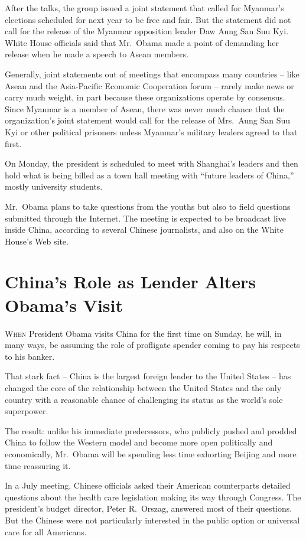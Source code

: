 ﻿\documentclass[12pt]{article}
\begin{document}
After the talks, the group issued a joint statement that called for Myanmar's elections scheduled
for next year to be free and fair. But the statement did not call for the release of the Myanmar
opposition leader Daw Aung San Suu Kyi. White House officials said that Mr.~Obama made a point of
demanding her release when he made a speech to Asean members.

Generally, joint statements out of meetings that encompass many countries -- like Asean and the
Asia-Pacific Economic Cooperation forum -- rarely make news or carry much weight, in part because
these organizations operate by consensus. Since Myanmar is a member of Asean, there was never much
chance that the organization's joint statement would call for the release of Mrs.~Aung San Suu Kyi
or other political prisoners unless Myanmar's military leaders agreed to that first.

On Monday, the president is scheduled to meet with Shanghai's leaders and then hold what is being
billed as a town hall meeting with ``future leaders of China,'' mostly university students.

Mr.~Obama plans to take questions from the youths but also to field questions submitted through the
Internet. The meeting is expected to be broadcast live inside China, according to several Chinese
journalists, and also on the White House's Web site.

\section{China's Role as Lender Alters Obama's Visit}

\lettrine{W}{hen} President Obama visits China for the first time on Sunday,
he will, in many ways, be assuming the role of profligate spender coming to pay his respects to his
banker.

That stark fact -- China is the largest foreign lender to the United States -- has changed the core
of the relationship between the United States and the only country with a reasonable chance of
challenging its status as the world's sole superpower.

The result: unlike his immediate predecessors, who publicly pushed and prodded China to follow the
Western model and become more open politically and economically, Mr.~Obama will be spending less
time exhorting Beijing and more time reassuring it.

In a July meeting, Chinese officials asked their American counterparts detailed questions about the
health care legislation making its way through Congress. The president's budget director, Peter
R.~Orszag, answered most of their questions. But the Chinese were not particularly interested in the
public option or universal care for all Americans.
\end{document}
